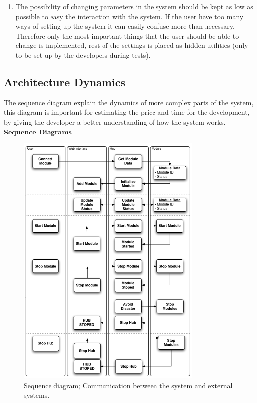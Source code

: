 \begin{enumerate}
	\item The possibility of changing parameters in the system should be kept as low as possible to easy the interaction with the system. If the user have too many ways of setting up the system it can easily confuse more than necessary. Therefore only the most important things that the user should be able to change is implemented, rest of the settings is placed as hidden utilities (only to be set up by the developers during tests). 
\end{enumerate}

\subsection{Architecture Dynamics}
The sequence diagram explain the dynamics of more complex parts of the system, this diagram is important for estimating the price and time for the development, by giving the developer a better understanding of how the system works.
\\ 
\textbf{Sequence Diagrams}
\begin{figure}[H]
	\begin{centering}
		 \includegraphics[width=0.8\textwidth]{images/SequenceDiagram.png}
		\caption{Sequence diagram; Communication between the system and external systems.}
 	\end{centering}
\end{figure}


